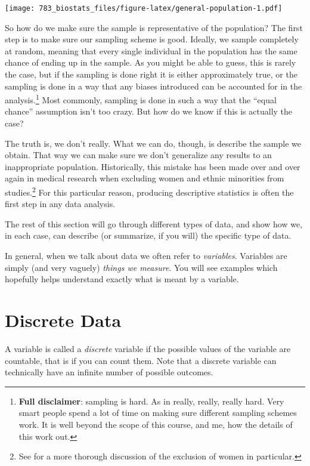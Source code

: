 \documentclass[]{book}
\let\rmarkdownfootnote\footnote%
\def\footnote{\protect\rmarkdownfootnote}
\theoremstyle{definition}
\theoremstyle{definition}
\theoremstyle{definition}
\theoremstyle{remark}
\begin{document}
\texttt{[image: 783\_biostats\_files/figure-latex/general-population-1.pdf]}

So how do we make sure the sample is representative of the population? The first step is to make sure our sampling scheme is good. Ideally, we sample completely at random, meaning that every single individual in the population has the same chance of ending up in the sample. As you might be able to guess, this is rarely the case, but if the sampling is done right it is either approximately true, or the sampling is done in a way that any biases introduced can be accounted for in the analysis.\footnote{\textbf{Full disclaimer}: sampling is hard. As in really, really, really hard. Very smart people spend a lot of time on making sure different sampling schemes work. It is well beyond the scope of this course, and me, how the details of this work out.} Most commonly, sampling is done in such a way that the ``equal chance'' assumption isn't too crazy. But how do we know if this is actually the case?

The truth is, we don't really. What we can do, though, is describe the sample we obtain. That way we can make sure we don't generalize any results to an inappropriate population. Historically, this mistake has been made over and over again in medical research when excluding women and ethnic minorities from studies.\footnote{See \citet{liu_womens_2016} for a more thorough discussion of the exclusion of women in particular.} For this particular reason, producing descriptive statistics is often the first step in any data analysis.

The rest of this section will go through different types of data, and show how we, in each case, can describe (or summarize, if you will) the specific type of data.

In general, when we talk about data we often refer to \emph{variables}. Variables are simply (and very vaguely) \emph{things we measure}. You will see examples which hopefully helps understand exactly what is meant by a variable.

\hypertarget{discrete}{%
\chapter{Discrete Data}\label{discrete}}

A variable is called a \emph{discrete} variable if the possible values of the variable are countable, that is if you can count them. Note that a discrete variable can technically have an infinite number of possible outcomes.
\end{document}
